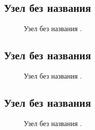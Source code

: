 \addtocounter{KnotNoName}{1}

\subsection{Узел без названия }

\begin{figure}[H]\centering
	\begin{minipage}{1\linewidth}
		\begin{center}
			\tcbox[enhanced jigsaw,colframe=black,opacityframe=0.5,opacityback=0.5]
			{\centering{}}
		\end{center}
	\end{minipage}
\caption{Узел без названия .}
\label{ris:KnotNoName_12}
\end{figure}

\addtocounter{KnotNoName}{1}

\subsection{Узел без названия }

\begin{figure}[H]\centering
	\begin{minipage}{1\linewidth}
		\begin{center}
			\tcbox[enhanced jigsaw,colframe=black,opacityframe=0.5,opacityback=0.5]
			{\centering{}}
		\end{center}
	\end{minipage}
\caption{Узел без названия .}
\label{ris:KnotNoName_13}
\end{figure}

\addtocounter{KnotNoName}{1}

\subsection{Узел без названия }

\begin{figure}[H]\centering
	\begin{minipage}{1\linewidth}
		\begin{center}
			\tcbox[enhanced jigsaw,colframe=black,opacityframe=0.5,opacityback=0.5]
			{\centering{}}
		\end{center}
	\end{minipage}
\caption{Узел без названия .}
\label{ris:KnotNoName_17}
\end{figure}

